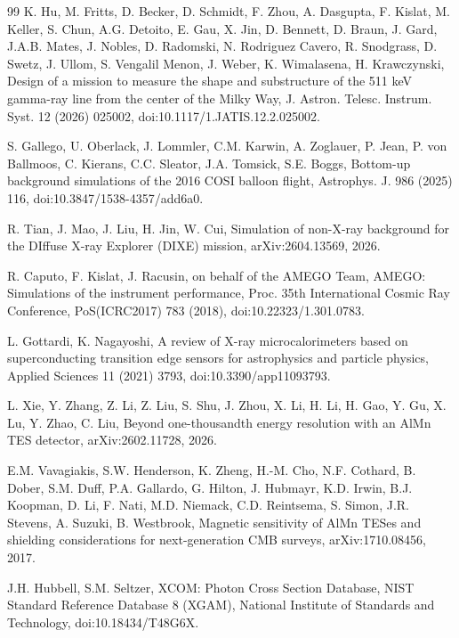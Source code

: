 \documentclass[11pt]{article}
\begin{document}
\begin{thebibliography}{99}
K. Hu, M. Fritts, D. Becker, D. Schmidt, F. Zhou, A. Dasgupta, F. Kislat, M. Keller, S. Chun, A.G. Detoito, E. Gau, X. Jin, D. Bennett, D. Braun, J. Gard, J.A.B. Mates, J. Nobles, D. Radomski, N. Rodriguez Cavero, R. Snodgrass, D. Swetz, J. Ullom, S. Vengalil Menon, J. Weber, K. Wimalasena, H. Krawczynski, Design of a mission to measure the shape and substructure of the 511 keV gamma-ray line from the center of the Milky Way, J. Astron. Telesc. Instrum. Syst. 12 (2026) 025002, doi:10.1117/1.JATIS.12.2.025002.

S. Gallego, U. Oberlack, J. Lommler, C.M. Karwin, A. Zoglauer, P. Jean, P. von Ballmoos, C. Kierans, C.C. Sleator, J.A. Tomsick, S.E. Boggs, Bottom-up background simulations of the 2016 COSI balloon flight, Astrophys. J. 986 (2025) 116, doi:10.3847/1538-4357/add6a0.

R. Tian, J. Mao, J. Liu, H. Jin, W. Cui, Simulation of non-X-ray background for the DIffuse X-ray Explorer (DIXE) mission, arXiv:2604.13569, 2026.

R. Caputo, F. Kislat, J. Racusin, on behalf of the AMEGO Team, AMEGO: Simulations of the instrument performance, Proc. 35th International Cosmic Ray Conference, PoS(ICRC2017) 783 (2018), doi:10.22323/1.301.0783.

L. Gottardi, K. Nagayoshi, A review of X-ray microcalorimeters based on superconducting transition edge sensors for astrophysics and particle physics, Applied Sciences 11 (2021) 3793, doi:10.3390/app11093793.

L. Xie, Y. Zhang, Z. Li, Z. Liu, S. Shu, J. Zhou, X. Li, H. Li, H. Gao, Y. Gu, X. Lu, Y. Zhao, C. Liu, Beyond one-thousandth energy resolution with an AlMn TES detector, arXiv:2602.11728, 2026.

E.M. Vavagiakis, S.W. Henderson, K. Zheng, H.-M. Cho, N.F. Cothard, B. Dober, S.M. Duff, P.A. Gallardo, G. Hilton, J. Hubmayr, K.D. Irwin, B.J. Koopman, D. Li, F. Nati, M.D. Niemack, C.D. Reintsema, S. Simon, J.R. Stevens, A. Suzuki, B. Westbrook, Magnetic sensitivity of AlMn TESes and shielding considerations for next-generation CMB surveys, arXiv:1710.08456, 2017.

J.H. Hubbell, S.M. Seltzer, XCOM: Photon Cross Section Database, NIST Standard Reference Database 8 (XGAM), National Institute of Standards and Technology, doi:10.18434/T48G6X.


\end{thebibliography}
\end{document}
